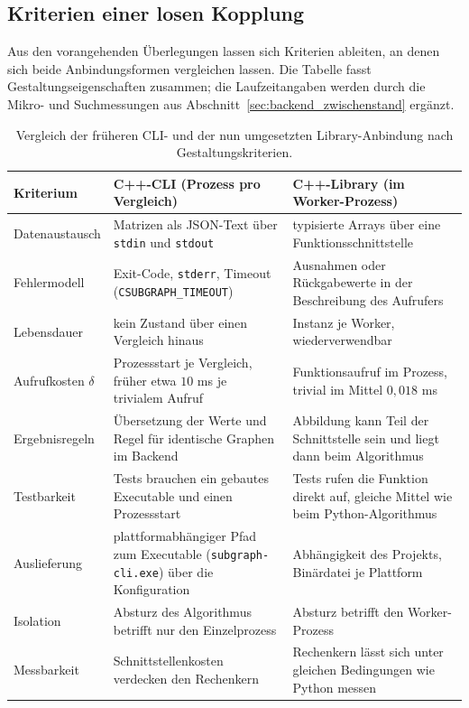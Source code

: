 \documentclass[a4paper,12pt, twoside]{report}
\theoremstyle{definition}
\begin{document}
\subsection{Kriterien einer losen Kopplung}
\label{sec:fremde_kriterien}

Aus den vorangehenden Überlegungen lassen sich Kriterien ableiten, an denen sich beide Anbindungsformen vergleichen lassen. Die Tabelle fasst Gestaltungseigenschaften zusammen; die Laufzeitangaben werden durch die Mikro- und Suchmessungen aus Abschnitt~\ref{sec:backend_zwischenstand} ergänzt.

\begin{table}[!h]
	\centering
	\small
	\caption{Vergleich der früheren CLI- und der nun umgesetzten Library-Anbindung nach Gestaltungskriterien.}
	\label{tab:fremde_kriterien}
	\begin{tabular}{@{}>{\raggedright\arraybackslash}p{3.0cm}>{\raggedright\arraybackslash}p{5.6cm}>{\raggedright\arraybackslash}p{5.6cm}@{}}
		\toprule
		Kriterium & C++-CLI (Prozess pro Vergleich) & C++-Library (im Worker-Prozess) \\
		\midrule
		Datenaustausch & Matrizen als JSON-Text über \texttt{stdin} und \texttt{stdout} & typisierte Arrays über eine Funktionsschnittstelle \\
		Fehlermodell & Exit-Code, \texttt{stderr}, Timeout (\texttt{CSUBGRAPH\_TIMEOUT}) & Ausnahmen oder Rückgabewerte in der Beschreibung des Aufrufers \\
		Lebensdauer & kein Zustand über einen Vergleich hinaus & Instanz je Worker, wiederverwendbar \\
		Aufrufkosten $\delta$ & Prozessstart je Vergleich, früher etwa $10$ ms je trivialem Aufruf & Funktionsaufruf im Prozess, trivial im Mittel $0{,}018$ ms \\
		Ergebnisregeln & Übersetzung der Werte und Regel für identische Graphen im Backend & Abbildung kann Teil der Schnittstelle sein und liegt dann beim Algorithmus \\
		Testbarkeit & Tests brauchen ein gebautes Executable und einen Prozessstart & Tests rufen die Funktion direkt auf, gleiche Mittel wie beim Python-Algorithmus \\
		Auslieferung & plattformabhängiger Pfad zum Executable (\texttt{subgraph-cli.exe}) über die Konfiguration & Abhängigkeit des Projekts, Binärdatei je Plattform \\
		Isolation & Absturz des Algorithmus betrifft nur den Einzelprozess & Absturz betrifft den Worker-Prozess \\
		Messbarkeit & Schnittstellenkosten verdecken den Rechenkern & Rechenkern lässt sich unter gleichen Bedingungen wie Python messen \\
		\bottomrule
	\end{tabular}
\end{table}
\end{document}
